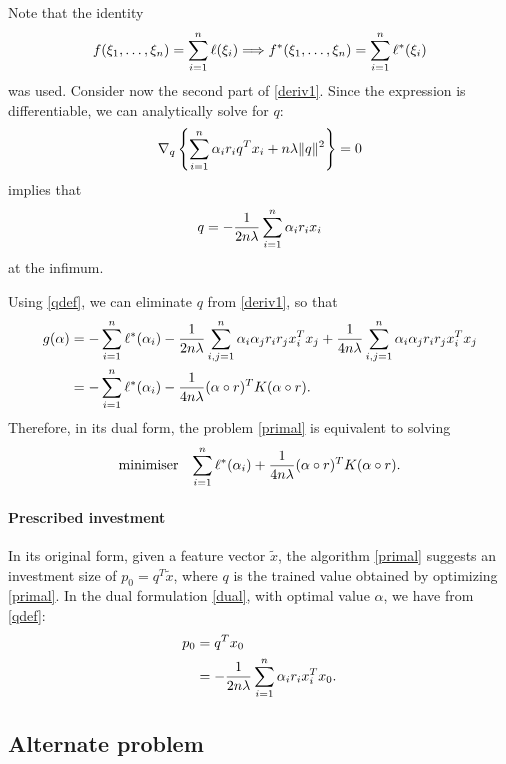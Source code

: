 Note that the identity
\begin{equation}
  \label{lemma1}
  f(\xi_1,\dots,\xi_n) = \sum_{i=1}^n \ell(\xi_i) \Longrightarrow f^*(\xi_1,\dots,\xi_n) = \sum_{i=1}^n \ell^*(\xi_i)
\end{equation}
was used. Consider now the second part of \eqref{deriv1}. Since
the expression is differentiable, we can analytically solve for $q$:
\begin{equation}
  \nabla_q \left\{\sum_{i=1}^n \alpha_ir_iq^Tx_i + n\lambda\|q\|^2\right\} = 0
\end{equation}
implies that
\begin{equation}
 q = -\frac{1}{2n\lambda}\sum_{i=1}^n \alpha_ir_ix_i \label{qdef}
\end{equation}
at the infimum.

Using \eqref{qdef}, we can eliminate $q$ from \eqref{deriv1}, so that
\begin{align}
  g(\alpha) &= -\sum_{i=1}^n \ell^*(\alpha_i) - \frac{1}{2n\lambda}\sum_{i,j=1}^n \alpha_i\alpha_jr_ir_jx_i^Tx_j + \frac{1}{4n\lambda}
         \sum_{i,j=1}^n \alpha_i\alpha_jr_ir_jx_i^Tx_j\\
       &= -\sum_{i=1}^n \ell^*(\alpha_i) - \frac{1}{4n\lambda}(\alpha \circ r)^TK(\alpha \circ r). 
\end{align}
Therefore, in its dual form, the problem \eqref{primal} is equivalent to solving
\begin{equation}
  \label{dual}
  \begin{array}{ll}\operatorname*{minimiser} & \displaystyle{\sum_{i=1}^n\ell^*(\alpha_i) + \frac{1}{4n\lambda}(\alpha \circ r)^TK(\alpha \circ r).}\end{array}
\end{equation}

\paragraph{Prescribed investment}

In its original form, given a feature vector $\tilde x$, the algorithm \eqref{primal}
suggests an investment size of $p_0=q^T\tilde x$, where $q$ is the trained value obtained by
optimizing \eqref{primal}. In the dual formulation \eqref{dual}, with optimal value
$\alpha$, we have from \eqref{qdef}:
\begin{align}
  p_0 &= q^Tx_0\\
      &= - \frac{1}{2n\lambda}\sum_{i=1}^n \alpha_ir_ix_i^Tx_0.
\end{align}


\subsection{Alternate problem}

